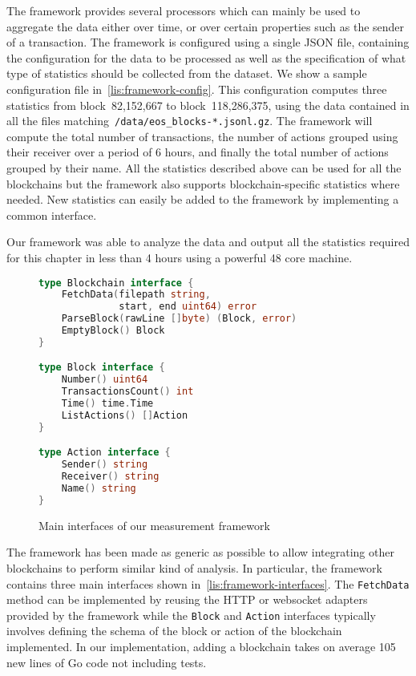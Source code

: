 The framework provides several processors which can mainly be used to aggregate the data either over time, or over certain properties such as the sender of a transaction.
The framework is configured using a single JSON file, containing the configuration for the data to be processed as well as the specification of what type of statistics should be collected from the dataset. We show a sample configuration file in~\autoref{lis:framework-config}.
This configuration computes three statistics from block~82,152,667 to block~118,286,375, using the data contained in all the files matching~\lstinline{/data/eos_blocks-*.jsonl.gz}.
The framework will compute the total number of transactions, the number of actions grouped using their receiver over a period of 6 hours, and finally the total number of actions grouped by their name.
All the statistics described above can be used for all the blockchains but the framework also supports blockchain-specific statistics where needed.
New statistics can easily be added to the framework by implementing a common interface.

Our framework was able to analyze the data and output all the statistics required for this chapter in less than 4 hours using a powerful 48 core machine.

\begin{figure}[ht]
\begin{lstlisting}[language=go]
type Blockchain interface {
    FetchData(filepath string,
              start, end uint64) error
    ParseBlock(rawLine []byte) (Block, error)
    EmptyBlock() Block
}

type Block interface {
    Number() uint64
    TransactionsCount() int
    Time() time.Time
    ListActions() []Action
}

type Action interface {
    Sender() string
    Receiver() string
    Name() string
}
\end{lstlisting}
  \caption{Main interfaces of our measurement framework}
  \label{lis:framework-interfaces}
\end{figure}

The framework has been made as generic as possible to allow integrating other blockchains to perform similar kind of analysis.
In particular, the framework contains three main interfaces shown in~\autoref{lis:framework-interfaces}.
The \lstinline{FetchData} method can be implemented by reusing the HTTP or websocket adapters provided by the framework while the \lstinline{Block} and \lstinline{Action} interfaces typically involves defining the schema of the block or action of the blockchain implemented.
In our implementation, adding a blockchain takes on average 105 new lines of Go code not including tests.


